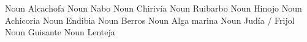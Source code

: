             {}          {Noun}      {Alcachofa}             {}
               {}          {Noun}      {Nabo}                  {}
              {}          {Noun}      {Chirivía}              {}
              {}          {Noun}      {Ruibarbo}              {}
               {}          {Noun}      {Hinojo}                {}
              {}          {Noun}      {Achicoria}             {}
               {}          {Noun}      {Endibia}               {}
           {}          {Noun}      {Berros}                {}
              {}          {Noun}      {Alga marina}           {}
                 {}          {Noun}      {Judía / Frijol}        {}
                  {}          {Noun}      {Guisante}              {}
               {}          {Noun}      {Lenteja}               {}